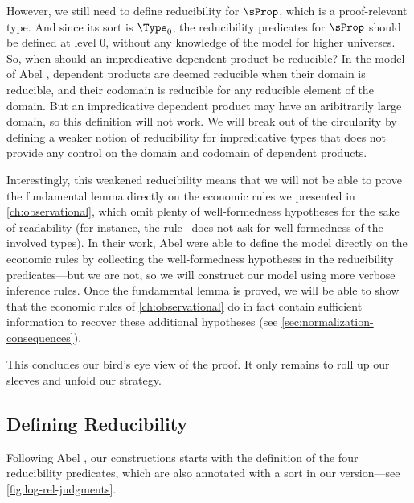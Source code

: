 However, we still need to define reducibility for \( \sProp \),
which is a proof-relevant type. And since its sort is \( \Type_0 \), the 
reducibility predicates for \( \sProp \) should be defined at level 0, without
any knowledge of the model for higher universes. 
% 
So, when should an impredicative dependent product be reducible?
% 
In the model of Abel \etal, dependent products are deemed reducible when
their domain is reducible, and their codomain is reducible 
for any reducible element of the domain. 
% 
But an impredicative dependent product may have an aribitrarily large domain,
so this definition will not work.
% 
We will break out of the circularity by defining a weaker notion of reducibility 
for impredicative types that does not provide any control on the domain and 
codomain of dependent products.

Interestingly, this weakened reducibility means that we will not be able to prove 
the fundamental lemma directly on the economic rules we presented 
in \cref{ch:observational}, which omit plenty of well-formedness hypotheses for 
the sake of readability 
% 
(for instance, the rule~ does not ask for 
well-formedness of the involved types).
% 
In their work, Abel \etal were able to define the model directly on the economic 
rules by collecting the well-formedness hypotheses in the reducibility predicates---but 
we are not, so we will construct our model using more verbose inference rules.
% 
Once the fundamental lemma is proved, we will be able to show that the economic 
rules of \cref{ch:observational} do in fact contain sufficient information to 
recover these additional hypotheses (see \cref{sec:normalization-consequences}).

This concludes our bird's eye view of the proof. It only remains to roll up our 
sleeves and unfold our strategy.
% 

\subsection{Defining Reducibility}
\label{sec:reducbility-proof-rel}

Following Abel \etal \cite{Abel:POPL2018}, our constructions starts with the 
definition of the four reducibility predicates, which are also annotated with
a sort in our version---see \cref{fig:log-rel-judgments}.

